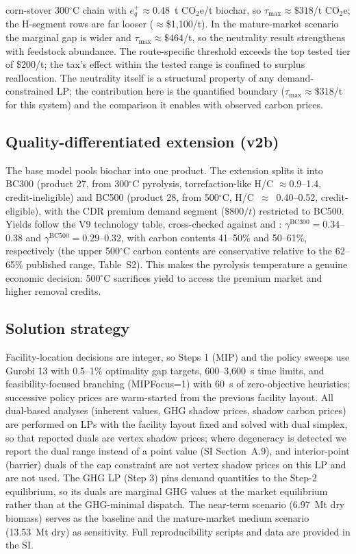 corn-stover 300$^\circ$C chain with $e^{+}_q\approx0.48$~t CO$_2$e/t biochar,
so $\tau_{\max}\approx\$318$/t CO$_2$e; the H-segment rows are far looser
($\approx$\$1{,}100/t). In the mature-market scenario the marginal gap is
wider and $\tau_{\max}\approx\$464$/t, so the neutrality result strengthens
with feedstock abundance. The route-specific threshold exceeds the top tested
tier of
\$200/t; the tax's effect within the tested range is confined to surplus
reallocation. The neutrality itself is a structural property of any
demand-constrained LP; the contribution here is the quantified boundary
($\tau_{\max}\approx\$318$/t for this system) and the comparison it enables
with observed carbon prices.

\subsection{Quality-differentiated extension (v2b)}
\label{sec:v2b}

The base model pools biochar into one product. The extension splits it into
BC300 (product 27, from 300$^\circ$C pyrolysis, torrefaction-like H/C
$\approx$0.9--1.4, credit-ineligible) and BC500
(product 28, from 500$^\circ$C, H/C~$\approx$~0.40--0.52, credit-eligible), with
the CDR premium demand
segment ($\$800/t$) restricted to BC500. Yields follow the V9 technology table,
cross-checked against \cite{roberts2010} and \cite{rafiq2016}:
$\gamma^{\mathrm{BC300}}=0.34$--$0.38$ and $\gamma^{\mathrm{BC500}}=0.29$--$0.32$,
with carbon contents 41--50\% and 50--61\%, respectively (the upper 500$^\circ$C
carbon contents are conservative relative to the 62--65\% published range,
Table~S2). This makes the
pyrolysis temperature a genuine economic decision: 500$^\circ$C sacrifices
yield to access the premium market and higher removal credits.

\subsection{Solution strategy}

Facility-location decisions are integer, so Steps 1 (MIP) and the policy sweeps
use Gurobi 13 with 0.5--1\% optimality gap targets, 600--3{,}600~s time limits, and
feasibility-focused branching (MIPFocus=1) with 60~s of zero-objective
heuristics; successive policy prices are warm-started from the previous
facility layout. All dual-based analyses (inherent values, GHG shadow prices, shadow
carbon prices) are performed on LPs with the facility layout fixed
and solved with dual simplex, so that reported duals are vertex
shadow prices; where degeneracy is detected we report the dual range instead
of a point value (SI Section~A.9), and interior-point (barrier) duals of the
cap constraint are not
vertex shadow prices on this LP and are not used. The GHG LP (Step 3) pins demand quantities to the
Step-2 equilibrium, so its duals are marginal GHG values at the market
equilibrium rather than at the GHG-minimal dispatch. The near-term scenario
(6.97~Mt dry biomass) serves as the baseline and the mature-market medium
scenario (13.53~Mt dry) as sensitivity. Full reproducibility scripts and data
are provided in the SI.

